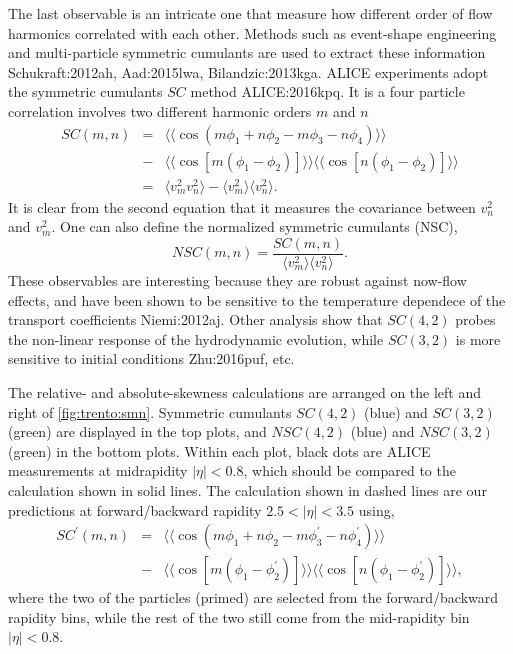The last observable is an intricate one that measure how different order of flow harmonics correlated with each other.
Methods such as event-shape engineering and multi-particle symmetric cumulants are used to extract these information {Schukraft:2012ah, Aad:2015lwa, Bilandzic:2013kga}.
ALICE experiments adopt the symmetric cumulants $SC$ method {ALICE:2016kpq}.
It is a four particle correlation involves two different harmonic orders $m$ and $n$
\begin{eqnarray}
SC(m, n) &=& \langle\langle \cos(m\phi_1+n\phi_2-m\phi_3-n\phi_4)\rangle\rangle \nonumber \\
\nonumber &-& \langle\langle\cos[m(\phi_1-\phi_2)]\rangle\rangle\langle\langle\cos[n(\phi_1-\phi_2)]\rangle\rangle \label{eq:scmn}\\
&=& \langle v_m^2 v_n^2 \rangle - \langle v_m^2\rangle\langle v_n^2\rangle.
\end{eqnarray}
It is clear from the second equation that it measures the covariance between $v_n^2$ and $v_m^2$.
One can also define the normalized symmetric cumulants (NSC),
\begin{equation}
NSC(m,n) = \frac{SC(m,n)}{\langle v_m^2\rangle\langle v_n^2\rangle}.
\end{equation}
These observables are interesting because they are robust against now-flow effects, and have been shown to be sensitive to the temperature dependece of the transport coefficients {Niemi:2012aj}.
Other analysis show that $SC(4,2)$ probes the non-linear response of the hydrodynamic evolution, while $SC(3,2)$ is more sensitive to initial conditions {Zhu:2016puf}, etc.

The relative- and absolute-skewness calculations are arranged on the left and right of \ref{fig:trento:smn}. Symmetric cumulants $SC(4,2)$ (blue) and $SC(3,2)$ (green) are displayed in the top plots, and $NSC(4,2)$ (blue) and $NSC(3,2)$ (green) in the bottom plots.
Within each plot, black dots are ALICE measurements at midrapidity $|\eta|<0.8$, which should be compared to the calculation shown in solid lines.
The calculation shown in dashed lines are our predictions at forward/backward rapidity $2.5 < |\eta| < 3.5$ using,
\begin{eqnarray}
SC^\prime(m, n) &=& \langle\langle \cos(m\phi_1+n\phi_2-m\phi_3^\prime-n\phi_4^\prime)\rangle\rangle \\
\nonumber &-& \langle\langle\cos[m(\phi_1-\phi_2^\prime)]\rangle\rangle\langle\langle\cos[n(\phi_1-\phi_2^\prime)]\rangle\rangle, \label{eq:scmn}
\end{eqnarray}
where the two of the particles (primed) are selected from the forward/backward rapidity bins, while the rest of the two still come from the mid-rapidity bin  $|\eta|<0.8$.

